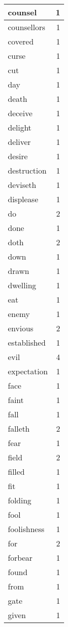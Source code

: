\begin{center}
\begin{longtable}{l|r}
counsel & 1\\ \hline 
counsellors & 1\\ \hline 
covered & 1\\ \hline 
curse & 1\\ \hline 
cut & 1\\ \hline 
day & 1\\ \hline 
death & 1\\ \hline 
deceive & 1\\ \hline 
delight & 1\\ \hline 
deliver & 1\\ \hline 
desire & 1\\ \hline 
destruction & 1\\ \hline 
deviseth & 1\\ \hline 
displease & 1\\ \hline 
do & 2\\ \hline 
done & 1\\ \hline 
doth & 2\\ \hline 
down & 1\\ \hline 
drawn & 1\\ \hline 
dwelling & 1\\ \hline 
eat & 1\\ \hline 
enemy & 1\\ \hline 
envious & 2\\ \hline 
established & 1\\ \hline 
evil & 4\\ \hline 
expectation & 1\\ \hline 
face & 1\\ \hline 
faint & 1\\ \hline 
fall & 1\\ \hline 
falleth & 2\\ \hline 
fear & 1\\ \hline 
field & 2\\ \hline 
filled & 1\\ \hline 
fit & 1\\ \hline 
folding & 1\\ \hline 
fool & 1\\ \hline 
foolishness & 1\\ \hline 
for & 2\\ \hline 
forbear & 1\\ \hline 
found & 1\\ \hline 
from & 1\\ \hline 
gate & 1\\ \hline 
given & 1\\ \hline 

\end{longtable}
\end{center}
